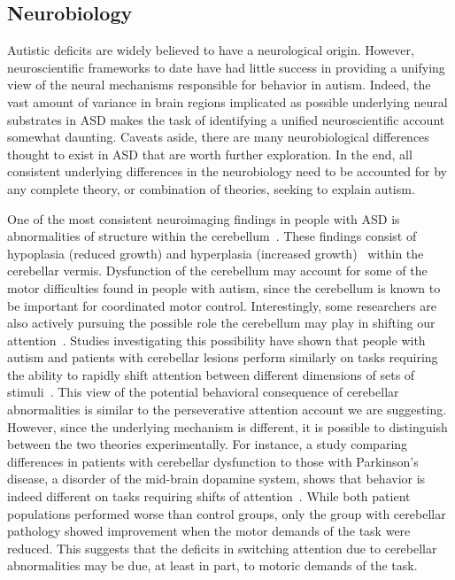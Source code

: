 \subsection{Neurobiology}

Autistic deficits are widely believed to have a neurological origin.  However, neuroscientific frameworks to date have had little success in providing a unifying view of the neural mechanisms responsible for behavior in autism.   Indeed, the vast amount of variance in brain regions implicated as possible underlying neural substrates in ASD makes the task of identifying a unified neuroscientific account somewhat daunting. Caveats aside, there are many neurobiological differences thought to exist in ASD that are worth further exploration. In the end, all consistent underlying differences in the neurobiology need to be accounted for by any complete theory, or combination of theories, seeking to explain autism. 

One of the most consistent neuroimaging findings in people with ASD is abnormalities of structure within the cerebellum~\cite{AkshoomoffNA:2000:Neurological,RefWorks:133}. These findings consist of hypoplasia (reduced growth) and hyperplasia (increased growth)~\cite{RodierPM:1996:AutismCerebellum} within the cerebellar vermis. Dysfunction of the cerebellum may account for some of the motor difficulties found in people with autism, since the cerebellum is known to be important for coordinated motor control.  Interestingly, some researchers are also actively pursuing the possible role the cerebellum may play in shifting our attention~\cite{RefWorks:135,CourchesneE:1994:CerebellumAttentionShift}.  Studies investigating this possibility have shown that people with autism and patients with cerebellar lesions perform similarly on tasks requiring the ability to rapidly shift attention between different dimensions of sets of stimuli~\cite{CourchesneE:1994:CerebellumAttentionShift,RefWorks:136,RefWorks:134}.  This view of the potential behavioral consequence of cerebellar abnormalities is similar to the perseverative attention account we are suggesting.  However, since the underlying mechanism is different, it is possible to distinguish between the two theories experimentally.  For instance, a study comparing differences in patients with cerebellar dysfunction to those with Parkinson's disease, a disorder of the mid-brain dopamine system, shows that behavior is indeed different on tasks requiring shifts of attention~\cite{RefWorks:145}.  While both patient populations performed worse than control groups, only the group with cerebellar pathology showed improvement when the motor demands of the task were reduced.  This suggests that the deficits in switching attention due to cerebellar abnormalities may be due, at least in part, to motoric demands of the task. 


